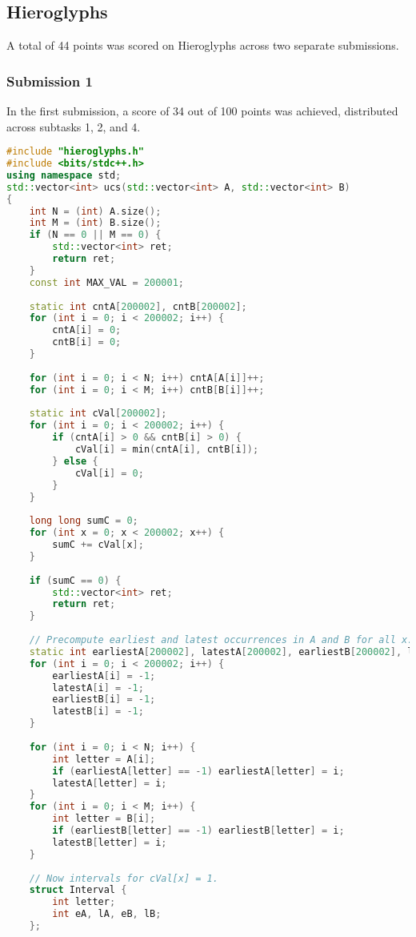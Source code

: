 \subsection{Hieroglyphs}
A total of 44 points was scored on Hieroglyphs across two separate submissions.

\subsubsection{Submission 1}
In the first submission, a score of 34 out of 100 points was achieved, distributed across subtasks 1, 2, and 4.

\begin{lstlisting}[language=C++]
#include "hieroglyphs.h"
#include <bits/stdc++.h>
using namespace std;
std::vector<int> ucs(std::vector<int> A, std::vector<int> B)
{
    int N = (int) A.size();
    int M = (int) B.size();
    if (N == 0 || M == 0) {
        std::vector<int> ret;
        return ret;
    }
    const int MAX_VAL = 200001;
 
    static int cntA[200002], cntB[200002];
    for (int i = 0; i < 200002; i++) {
        cntA[i] = 0;
        cntB[i] = 0;
    }
 
    for (int i = 0; i < N; i++) cntA[A[i]]++;
    for (int i = 0; i < M; i++) cntB[B[i]]++;
 
    static int cVal[200002];
    for (int i = 0; i < 200002; i++) {
        if (cntA[i] > 0 && cntB[i] > 0) {
            cVal[i] = min(cntA[i], cntB[i]);
        } else {
            cVal[i] = 0;
        }
    }
 
    long long sumC = 0;
    for (int x = 0; x < 200002; x++) {
        sumC += cVal[x];
    }
 
    if (sumC == 0) {
        std::vector<int> ret;
        return ret;
    }
 
    // Precompute earliest and latest occurrences in A and B for all x.
    static int earliestA[200002], latestA[200002], earliestB[200002], latestB[200002];
    for (int i = 0; i < 200002; i++) {
        earliestA[i] = -1;
        latestA[i] = -1;
        earliestB[i] = -1;
        latestB[i] = -1;
    }
 
    for (int i = 0; i < N; i++) {
        int letter = A[i];
        if (earliestA[letter] == -1) earliestA[letter] = i;
        latestA[letter] = i;
    }
    for (int i = 0; i < M; i++) {
        int letter = B[i];
        if (earliestB[letter] == -1) earliestB[letter] = i;
        latestB[letter] = i;
    }
 
    // Now intervals for cVal[x] = 1.
    struct Interval {
        int letter;
        int eA, lA, eB, lB;
    };
 

\end{lstlisting}
